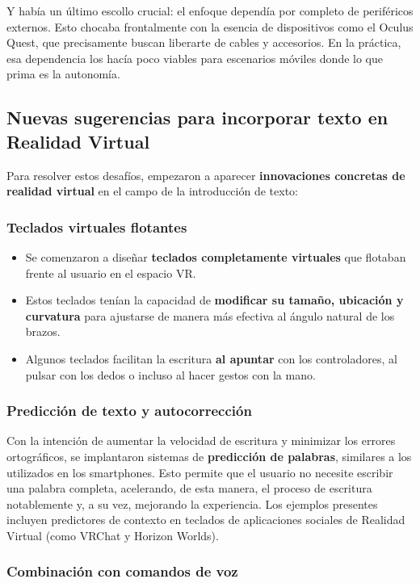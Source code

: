 Y había un último escollo crucial: el enfoque dependía por completo de periféricos externos. Esto chocaba frontalmente con la esencia de dispositivos como el Oculus Quest, que precisamente buscan liberarte de cables y accesorios. En la práctica, esa dependencia los hacía poco viables para escenarios móviles donde lo que prima es la autonomía.


\subsection{Nuevas sugerencias para incorporar texto en Realidad Virtual}
Para resolver estos desafíos, empezaron a aparecer \textbf{innovaciones concretas de realidad virtual} en el campo de la introducción de texto:

\subsubsection{Teclados virtuales flotantes}
\begin{itemize}
	\item Se comenzaron a diseñar \textbf{teclados completamente virtuales} que flotaban frente al usuario en el espacio VR.
	\item Estos teclados tenían la capacidad de \textbf{modificar su tamaño, ubicación y curvatura} para ajustarse de manera más efectiva al ángulo natural de los brazos.
	\item Algunos teclados facilitan la escritura \textbf{al apuntar} con los controladores, al pulsar con los dedos o incluso al hacer gestos con la mano.
\end{itemize}

\subsubsection{Predicción de texto y autocorrección}

	Con la intención de aumentar la velocidad de escritura y minimizar los errores ortográficos, se implantaron sistemas de \textbf{predicción de palabras}, similares a los utilizados en los smartphones. Esto permite que el usuario no necesite escribir una palabra completa, acelerando, de esta manera, el proceso de escritura notablemente y, a su vez, mejorando la experiencia. Los ejemplos presentes incluyen predictores de contexto en teclados de aplicaciones sociales de Realidad Virtual (como VRChat y Horizon Worlds).


\subsubsection{Combinación con comandos de voz}


